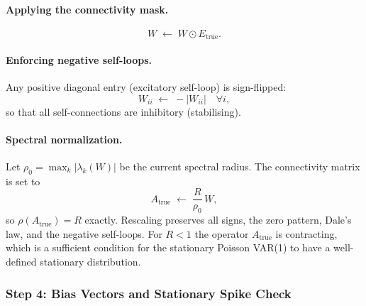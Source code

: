 \documentclass[11pt]{article}
\begin{document}
\paragraph{Applying the connectivity mask.}
\begin{equation}
  W \;\leftarrow\; W \odot E_{\text{true}}.
\end{equation}

\paragraph{Enforcing negative self-loops.}
Any positive diagonal entry (excitatory self-loop) is sign-flipped:
\begin{equation}
  W_{ii} \;\leftarrow\; -|W_{ii}| \quad \forall i,
\end{equation}
so that all self-connections are inhibitory (stabilising).

\paragraph{Spectral normalization.}
Let $\rho_0 = \max_k |\lambda_k(W)|$ be the current spectral radius.
The connectivity matrix is set to
\begin{equation}
  A_{\text{true}} \;\leftarrow\; \frac{R}{\rho_0}\, W,
  \label{eq:spectral}
\end{equation}
so $\rho(A_{\text{true}}) = R$ exactly.
Rescaling preserves all signs, the zero pattern, Dale's law, and
the negative self-loops.
For $R < 1$ the operator $A_{\text{true}}$ is contracting, which is
a sufficient condition for the stationary Poisson VAR(1) to have a
well-defined stationary distribution.

\subsubsection{Step 4: Bias Vectors and Stationary Spike Check}
\label{sec:bias}
\end{document}
